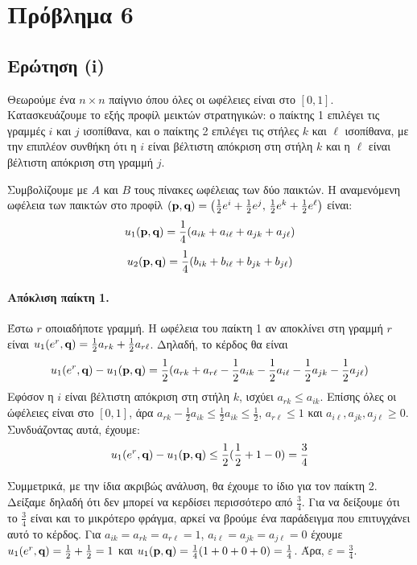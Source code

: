 \section{Πρόβλημα 6}

\subsection{Ερώτηση (i)}

Θεωρούμε ένα $n \times n$ παίγνιο όπου όλες οι ωφέλειες είναι στο $[0,1]$.
Κατασκευάζουμε το εξής προφίλ μεικτών στρατηγικών: ο παίκτης 1 επιλέγει τις
γραμμές $i$ και $j$ ισοπίθανα, και ο παίκτης 2 επιλέγει τις στήλες $k$ και
$\ell$ ισοπίθανα, με την επιπλέον συνθήκη ότι η $i$ είναι βέλτιστη απόκριση
στη στήλη $k$ και η $\ell$ είναι βέλτιστη απόκριση στη γραμμή $j$.

Συμβολίζουμε με $A$ και $B$ τους πίνακες ωφέλειας των δύο παικτών. Η αναμενόμενη
ωφέλεια των παικτών στο προφίλ $(\textbf{p}, \textbf{q}) = \left(\frac{1}{2}e^i +
\frac{1}{2}e^j,\, \frac{1}{2}e^k + \frac{1}{2}e^\ell\right)$ είναι:
$$
u_1(\textbf{p}, \textbf{q}) = \frac{1}{4}(a_{ik} + a_{i\ell} + a_{jk} + a_{j\ell}) \\
$$
$$
u_2(\textbf{p}, \textbf{q}) = \frac{1}{4}(b_{ik} + b_{i\ell} + b_{jk} + b_{j\ell})
$$

\paragraph{Απόκλιση παίκτη 1.}
Έστω $r$ οποιαδήποτε γραμμή. Η ωφέλεια του παίκτη 1 αν αποκλίνει στη γραμμή $r$
είναι $u_1(e^r, \textbf{q}) = \frac{1}{2}a_{rk} + \frac{1}{2}a_{r\ell}$. Δηλαδή, το
κέρδος θα είναι
$$
u_1(e^r, \textbf{q}) - u_1(\textbf{p}, \textbf{q}) =
    \frac{1}{2}(a_{rk} + a_{r\ell} -
        \frac{1}{2}a_{ik} - \frac{1}{2}a_{i\ell} -
        \frac{1}{2}a_{jk} - \frac{1}{2}a_{j\ell})
$$
Εφόσον η $i$ είναι βέλτιστη απόκριση στη στήλη $k$, ισχύει $a_{rk} \leq a_{ik}$.
Επίσης όλες οι ώφέλειες είναι στο $[0,1]$, άρα $a_{rk} - \frac{1}{2} a_{ik}
\leq \frac{1}{2} a_{ik} \leq \frac{1}{2}$, $a_{r\ell} \leq 1$ και
$a_{i\ell}, a_{jk}, a_{j\ell} \geq 0$. Συνδυάζοντας
αυτά, έχουμε:
$$
u_1(e^r, \textbf{q}) - u_1(\textbf{p}, \textbf{q}) \leq \frac{1}{2} (\frac{1}{2} + 1 - 0) = \frac{3}{4}
$$

Συμμετρικά, με την ίδια ακριβώς ανάλυση, θα έχουμε το ίδιο για τον παίκτη 2.
Δείξαμε δηλαδή ότι δεν μπορεί να κερδίσει περισσότερο από $\frac{3}{4}$. Για να
δείξουμε ότι το $\frac{3}{4}$ είναι και το μικρότερο φράγμα, αρκεί να βρούμε
ένα παράδειγμα που επιτυγχάνει αυτό το κέρδος. Για
$a_{ik} = a_{rk} = a_{r\ell} = 1$, $a_{i\ell} = a_{jk} = a_{j\ell} = 0$ έχουμε
$u_1(e^r, \textbf{q}) = \frac{1}{2} + \frac{1}{2} = 1$ και
$u_1(\textbf{p}, \textbf{q}) = \frac{1}{4} (1 + 0 + 0 + 0) = \frac{1}{4}$. Άρα,
$\varepsilon = \frac{3}{4}$.

